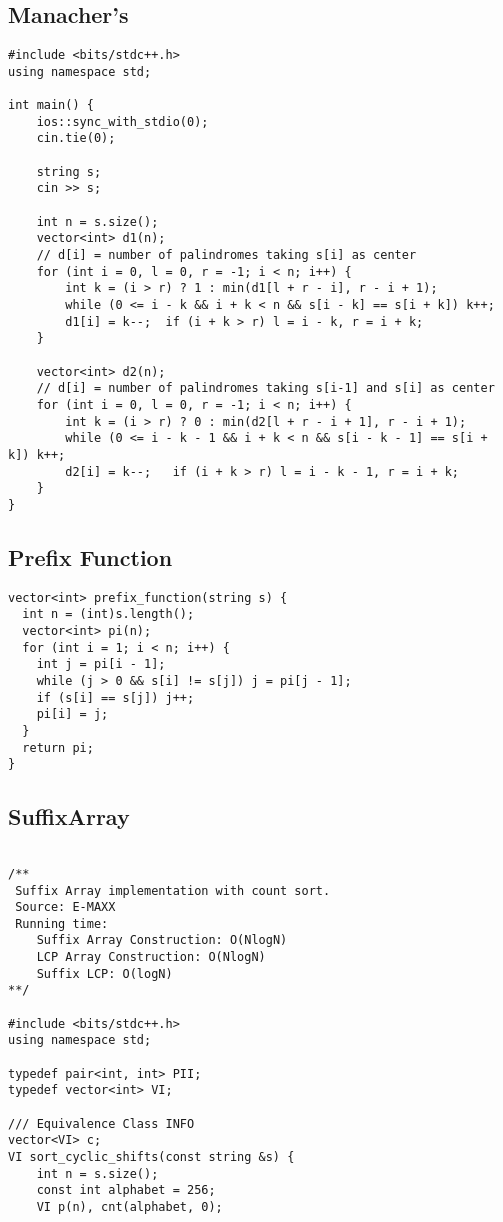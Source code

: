 \documentclass[FSZ,a4paper,onesided]{article}
\begin{document}
\begin{multicols*}{\COLS}
\subsection{Manacher's}
\begin{lstlisting}
#include <bits/stdc++.h>
using namespace std;

int main() {
    ios::sync_with_stdio(0);
    cin.tie(0);

    string s;
    cin >> s;

    int n = s.size();
    vector<int> d1(n);
    // d[i] = number of palindromes taking s[i] as center
    for (int i = 0, l = 0, r = -1; i < n; i++) {
        int k = (i > r) ? 1 : min(d1[l + r - i], r - i + 1);
        while (0 <= i - k && i + k < n && s[i - k] == s[i + k]) k++;
        d1[i] = k--;  if (i + k > r) l = i - k, r = i + k;
    }

    vector<int> d2(n);
    // d[i] = number of palindromes taking s[i-1] and s[i] as center
    for (int i = 0, l = 0, r = -1; i < n; i++) {
        int k = (i > r) ? 0 : min(d2[l + r - i + 1], r - i + 1);
        while (0 <= i - k - 1 && i + k < n && s[i - k - 1] == s[i + k]) k++;
        d2[i] = k--;   if (i + k > r) l = i - k - 1, r = i + k;
    }
}
\end{lstlisting}
\subsection{Prefix Function}
\begin{lstlisting}
vector<int> prefix_function(string s) {
  int n = (int)s.length();
  vector<int> pi(n);
  for (int i = 1; i < n; i++) {
    int j = pi[i - 1];
    while (j > 0 && s[i] != s[j]) j = pi[j - 1];
    if (s[i] == s[j]) j++;
    pi[i] = j;
  }
  return pi;
}
\end{lstlisting}
\subsection{SuffixArray}
\begin{lstlisting}

/**
 Suffix Array implementation with count sort.
 Source: E-MAXX
 Running time:
    Suffix Array Construction: O(NlogN)
    LCP Array Construction: O(NlogN)
    Suffix LCP: O(logN)
**/

#include <bits/stdc++.h>
using namespace std;

typedef pair<int, int> PII;
typedef vector<int> VI;

/// Equivalence Class INFO
vector<VI> c;
VI sort_cyclic_shifts(const string &s) {
    int n = s.size();
    const int alphabet = 256;
    VI p(n), cnt(alphabet, 0);


\end{lstlisting}
\end{multicols*}
\end{document}
